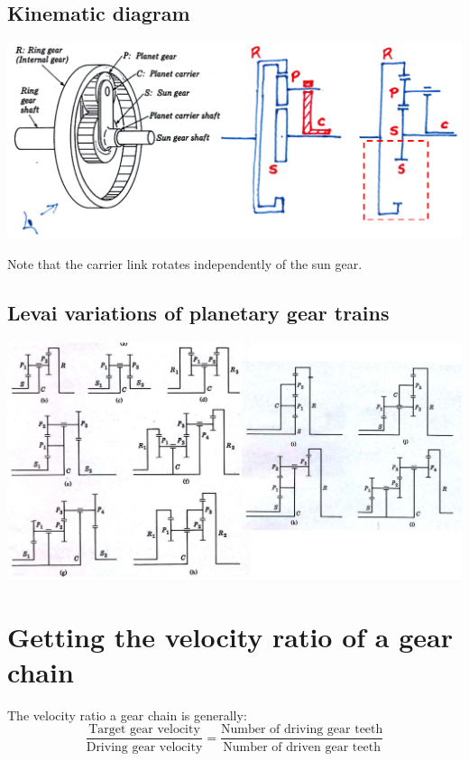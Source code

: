 \documentclass[11pt]{article}
\begin{document}
 \newpage
\subsection{Kinematic diagram}
\label{sec:org271b3a6}
\begin{center}
\includegraphics[width=.9\linewidth]{./images/planetary-gear-train-kinematic-diagram.png}
\end{center}

Note that the carrier link rotates independently of the sun gear.
\subsection{Levai variations of planetary gear trains}
\label{sec:orgd57231d}
\begin{center}
\includegraphics[width=.9\linewidth]{./images/levai-variations-of-planetary-gear-trains.png}
\end{center}

 \newpage
\section{Getting the velocity ratio of a gear chain}
\label{sec:org2ba2c74}
The velocity ratio a gear chain is generally:
\[\frac{\text{Target gear velocity}}{\text{Driving gear velocity}} = \frac{\text{Number of driving gear teeth}}{\text{Number of driven gear teeth}}\]
\end{document}
